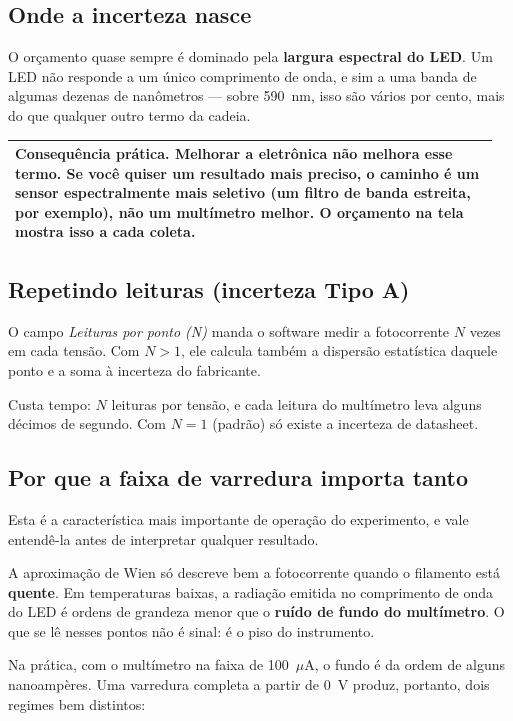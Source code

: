 \documentclass[11pt,a4paper]{article}
\newcommand{\campo}[1]{\textsf{\textit{#1}}}
\newenvironment{aviso}
  {\par\medskip\noindent\begin{tabular}{|p{0.96\linewidth}|}\hline\rule{0pt}{3ex}}
  {\\[1ex]\hline\end{tabular}\par\medskip}
\begin{document}
\subsection{Onde a incerteza nasce}

O orçamento quase sempre é dominado pela \textbf{largura espectral do LED}. Um
LED não responde a um único comprimento de onda, e sim a uma banda de algumas
dezenas de nanômetros --- sobre 590~nm, isso são vários por cento, mais do que
qualquer outro termo da cadeia.

\begin{aviso}
\textbf{Consequência prática.} Melhorar a eletrônica não melhora esse termo.
Se você quiser um resultado mais preciso, o caminho é um sensor espectralmente
mais seletivo (um filtro de banda estreita, por exemplo), não um multímetro
melhor. O orçamento na tela mostra isso a cada coleta.
\end{aviso}

\subsection{Repetindo leituras (incerteza Tipo A)}

O campo \campo{Leituras por ponto (N)} manda o software medir a fotocorrente
$N$ vezes em cada tensão. Com $N > 1$, ele calcula também a dispersão
estatística daquele ponto e a soma à incerteza do fabricante.

Custa tempo: $N$ leituras por tensão, e cada leitura do multímetro leva alguns
décimos de segundo. Com $N = 1$ (padrão) só existe a incerteza de datasheet.

\subsection{Por que a faixa de varredura importa tanto}
\label{sec:faixa}

Esta é a característica mais importante de operação do experimento, e vale
entendê-la antes de interpretar qualquer resultado.

A aproximação de Wien só descreve bem a fotocorrente quando o filamento está
\textbf{quente}. Em temperaturas baixas, a radiação emitida no comprimento de
onda do LED é ordens de grandeza menor que o \textbf{ruído de fundo do
multímetro}. O que se lê nesses pontos não é sinal: é o piso do instrumento.

Na prática, com o multímetro na faixa de 100~$\mu$A, o fundo é da ordem de
alguns nanoampères. Uma varredura completa a partir de 0~V produz, portanto,
dois regimes bem distintos:
\end{document}
